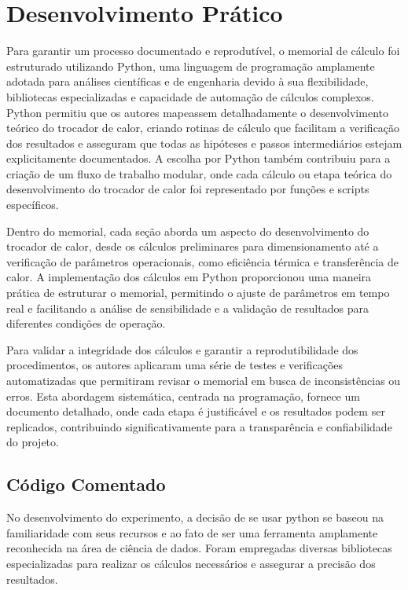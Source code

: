 \section{Desenvolvimento Prático}

Para garantir um processo documentado e reprodutível, o memorial de cálculo foi estruturado utilizando Python, uma linguagem de programação amplamente adotada para análises científicas e de engenharia devido à sua flexibilidade, bibliotecas especializadas e capacidade de automação de cálculos complexos. Python permitiu que os autores mapeassem detalhadamente o desenvolvimento teórico do trocador de calor, criando rotinas de cálculo que facilitam a verificação dos resultados e asseguram que todas as hipóteses e passos intermediários estejam explicitamente documentados. A escolha por Python também contribuiu para a criação de um fluxo de trabalho modular, onde cada cálculo ou etapa teórica do desenvolvimento do trocador de calor foi representado por funções e scripts específicos.

Dentro do memorial, cada seção aborda um aspecto do desenvolvimento do trocador de calor, desde os cálculos preliminares para dimensionamento até a verificação de parâmetros operacionais, como eficiência térmica e transferência de calor. A implementação dos cálculos em Python proporcionou uma maneira prática de estruturar o memorial, permitindo o ajuste de parâmetros em tempo real e facilitando a análise de sensibilidade e a validação de resultados para diferentes condições de operação.

Para validar a integridade dos cálculos e garantir a reprodutibilidade dos procedimentos, os autores aplicaram uma série de testes e verificações automatizadas que permitiram revisar o memorial em busca de inconsistências ou erros. Esta abordagem sistemática, centrada na programação, fornece um documento detalhado, onde cada etapa é justificável e os resultados podem ser replicados, contribuindo significativamente para a transparência e confiabilidade do projeto.

\subsection{Código Comentado}
No desenvolvimento do experimento, a decisão de se usar python se baseou na familiaridade com seus recursos e ao fato de ser uma ferramenta amplamente reconhecida na área de ciência de dados. Foram empregadas diversas bibliotecas especializadas para realizar os cálculos necessários e assegurar a precisão dos resultados. 

